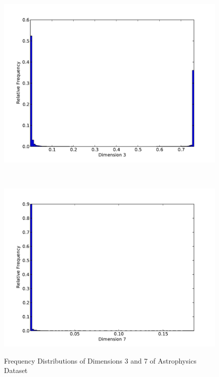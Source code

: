 \begin{figure}
	\begin{center}
		\begin{subfloat}{%
			\includegraphics[scale=0.36]{figures/histograms/astrophysics_500000_2.pdf}
		}
		\end{subfloat}~
		\begin{subfloat}{%
			\includegraphics[scale=0.36]{figures/histograms/astrophysics_500000_6.pdf}
		}
		\end{subfloat}
	\end{center}

	\caption{Frequency Distributions of Dimensions 3 and 7 of Astrophysics Dataset}
	\label{fig:astrophysics-histograms2}
\end{figure}

